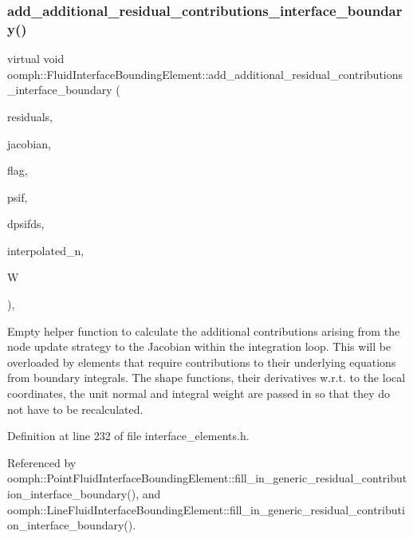 \subsubsection{\texorpdfstring{add\+\_\+additional\+\_\+residual\+\_\+contributions\+\_\+interface\+\_\+boundary()}{add\_additional\_residual\_contributions\_interface\_boundary()}}
{\footnotesize\ttfamily virtual void oomph\+::\+Fluid\+Interface\+Bounding\+Element\+::add\+\_\+additional\+\_\+residual\+\_\+contributions\+\_\+interface\+\_\+boundary (\begin{DoxyParamCaption}\item[{\hyperlink{classoomph_1_1Vector}{Vector}$<$ double $>$ \&}]{residuals,  }\item[{\hyperlink{classoomph_1_1DenseMatrix}{Dense\+Matrix}$<$ double $>$ \&}]{jacobian,  }\item[{const unsigned \&}]{flag,  }\item[{const \hyperlink{classoomph_1_1Shape}{Shape} \&}]{psif,  }\item[{const \hyperlink{classoomph_1_1DShape}{D\+Shape} \&}]{dpsifds,  }\item[{const \hyperlink{classoomph_1_1Vector}{Vector}$<$ double $>$ \&}]{interpolated\+\_\+n,  }\item[{const double \&}]{W }\end{DoxyParamCaption})\hspace{0.3cm}{\ttfamily [inline]}, {\ttfamily [virtual]}}



Empty helper function to calculate the additional contributions arising from the node update strategy to the Jacobian within the integration loop. This will be overloaded by elements that require contributions to their underlying equations from boundary integrals. The shape functions, their derivatives w.\+r.\+t. to the local coordinates, the unit normal and integral weight are passed in so that they do not have to be recalculated. 



Definition at line 232 of file interface\+\_\+elements.\+h.



Referenced by oomph\+::\+Point\+Fluid\+Interface\+Bounding\+Element\+::fill\+\_\+in\+\_\+generic\+\_\+residual\+\_\+contribution\+\_\+interface\+\_\+boundary(), and oomph\+::\+Line\+Fluid\+Interface\+Bounding\+Element\+::fill\+\_\+in\+\_\+generic\+\_\+residual\+\_\+contribution\+\_\+interface\+\_\+boundary().

\mbox{\label{classoomph_1_1FluidInterfaceBoundingElement_ae5d097813762a2544d0b49c6e2fbaaac}} 
